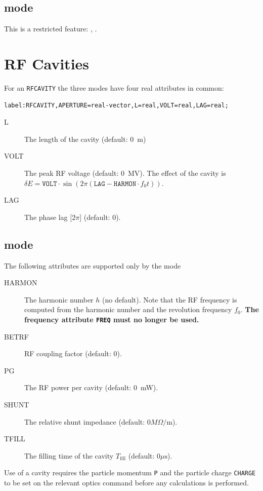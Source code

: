 \subsection{\opalcycl mode}

This is a restricted feature: \noopalt, \noopalcycl .

\section{RF Cavities}
\label{sec:cavity}
For an \texttt{RFCAVITY} the three modes have four real attributes in common:
\begin{verbatim}
label:RFCAVITY,APERTURE=real-vector,L=real,VOLT=real,LAG=real;
\end{verbatim}
\begin{description}
\item[L]
  The length of the cavity (default: 0~m)
\item[VOLT]
  The peak RF voltage (default: 0~MV).
  The effect of the cavity is
  $\delta E=\mathtt{VOLT}\cdot\sin(2\pi(\mathtt{LAG}-\mathtt{HARMON}\cdot f_0 t))$.
\item[LAG]
  The phase lag [$2\pi$] (default: 0).
\end{description}

\subsection{\opalmap mode}
The following attributes are supported only by the \opalmap mode
\begin{description}
\item[HARMON]
  The harmonic number $h$ (no default).
  Note that the RF frequency is computed from the harmonic number
  and the revolution frequency $f_0$.
  \textbf{The frequency attribute \texttt{FREQ} must no longer be used.}
\item[BETRF]
  RF coupling factor (default: 0).
\item[PG]
  The RF power per cavity (default: 0~mW).
\item[SHUNT]
  The relative shunt impedance (default: $0 M\Omega/\mathrm{m}$).
\item[TFILL]
  The filling time of the cavity $T_\mathrm{fill}$
  (default: $0 \mu\mathrm{s}$).
\end{description}
Use of a cavity requires the particle momentum \texttt{P}
and the particle charge \texttt{CHARGE} to be set on the relevant 
optics command before any calculations is performed.


